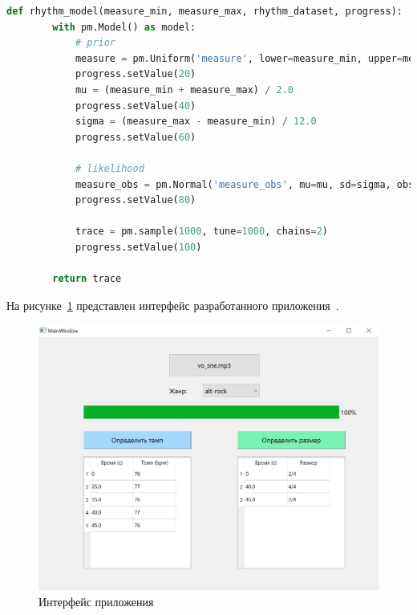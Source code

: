 \begin{lstlisting}[label={lst:measuremodel}, caption={реализация байесовской модели для определения ритма}, language=python]
	def rhythm_model(measure_min, measure_max, rhythm_dataset, progress):
		with pm.Model() as model:
			# prior
			measure = pm.Uniform('measure', lower=measure_min, upper=measure_max)
			progress.setValue(20)
			mu = (measure_min + measure_max) / 2.0
			progress.setValue(40)
			sigma = (measure_max - measure_min) / 12.0
			progress.setValue(60)
	
			# likelihood
			measure_obs = pm.Normal('measure_obs', mu=mu, sd=sigma, observed=rhythm_dataset)
			progress.setValue(80)
	
			trace = pm.sample(1000, tune=1000, chains=2)
			progress.setValue(100)
	
		return trace
\end{lstlisting}

На рисунке~\ref{img:gui} представлен интерфейс разработанного приложения~\cite{pyqt}.

\begin{figure}[h]
	\centering
	\includegraphics[scale=0.7]{inc/img/gui.jpg}
	\caption{Интерфейс приложения}
	\label{img:gui}
\end{figure}
